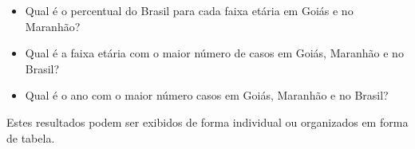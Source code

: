 \documentclass[
]{article}
\providecommand{\tightlist}{%
  \setlength{\itemsep}{0pt}\setlength{\parskip}{0pt}}
\begin{document}
\begin{itemize}
\tightlist
\item
  Qual é o percentual do Brasil para cada faixa etária em Goiás e no
  Maranhão?
\item
  Qual é a faixa etária com o maior número de casos em Goiás, Maranhão e
  no Brasil?
\item
  Qual é o ano com o maior número casos em Goiás, Maranhão e no Brasil?
\end{itemize}

Estes resultados podem ser exibidos de forma individual ou organizados
em forma de tabela.
\end{document}
